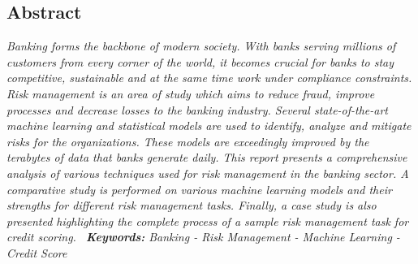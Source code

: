 \documentclass[a4paper, 12pt]{article}
\begin{document}
\newpage
\begin{center}
\section*{\centering Abstract}
\end{center}
\textit{
{\fontsize{10pt}{10pt}\selectfont Banking forms the backbone of modern society. With banks serving millions of customers from every corner of the world, it becomes crucial for banks to stay competitive, sustainable and at the same time work under compliance constraints. Risk management is an area of study which aims to reduce fraud, improve processes and decrease losses to the banking industry. Several state-of-the-art machine learning and statistical models are used to identify, analyze and mitigate risks for the organizations. These models are exceedingly improved by the terabytes of data that banks generate daily. This report presents a comprehensive analysis of various techniques used for risk management in the banking sector. A comparative study is performed on various machine learning models and their strengths for different risk management tasks. Finally, a case study is also presented highlighting the complete process of a sample risk management task for credit scoring.
}
}
\vskip 0.1in
\noindent\
\emph{
{\fontsize{10pt}{10pt}\selectfont \textbf{Keywords:}  Banking - Risk Management - Machine Learning - Credit Score}}
\end{document}
